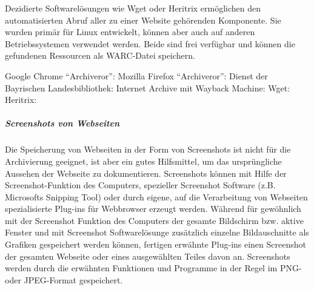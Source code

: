 Dezidierte Softwarelösungen wie Wget oder Heritrix ermöglichen den automatisierten Abruf aller zu einer Website gehörenden Komponente. Sie wurden primär für Linux entwickelt, können aber auch auf anderen Betriebssystemen verwendet werden. Beide sind frei verfügbar und können die gefundenen Ressourcen als WARC-Datei speichern.  

\begin{flushleft}
	Google Chrome "`Archiveror"': 
	Mozilla Firefox "`Archiveror"': 
	Dienst der Bayrischen Landesbibliothek:  
	Internet Archive mit Wayback Machine: 
	Wget: 
	Heritrix: 
\end{flushleft}


\subparagraph{Screenshots von Webseiten}
Die Speicherung von Webseiten in der Form von Screenshots ist nicht für die Archivierung geeignet, ist aber ein gutes Hilfsmittel, um das ursprüngliche Aussehen der Webseite zu dokumentieren. Screenshots können mit Hilfe der Screenshot-Funktion des Computers, spezieller Screenshot Software (z.B. Microsofts Snipping Tool) oder durch eigene, auf die Verarbeitung von Webseiten spezialisierte Plug-ins für Webbrowser erzeugt werden. Während für gewöhnlich mit der Screenshot Funktion des Computers der gesamte Bildschirm bzw. aktive Fenster und mit Screenshot Softwarelösunge zusätzlich einzelne Bildauschnitte als Grafiken gespeichert werden können, fertigen erwähnte Plug-ins einen Screenshot der gesamten Webseite oder eines ausgewählten Teiles davon an. Screenshots werden durch die erwähnten Funktionen und Programme in der Regel im PNG- oder JPEG-Format gespeichert.




